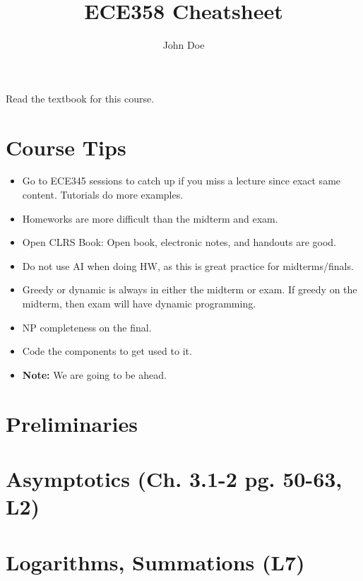 \documentclass{article}
\title{ECE358 Cheatsheet}
\author{John Doe}
\begin{document}
\maketitle

\tableofcontents

\listoffigures

\listoftables

Read the textbook for this course. 

\section{Course Tips}
\begin{intuition}
    \begin{itemize}
        \item Go to ECE345 sessions to catch up if you miss a lecture since exact same content. Tutorials do more examples. 
        \item Homeworks are more difficult than the midterm and exam.
        \item Open CLRS Book: Open book, electronic notes, and handouts are good. 
        \item Do not use AI when doing HW, as this is great practice for midterms/finals.
        \item Greedy or dynamic is always in either the midterm or exam. If greedy on the midterm, then exam will have dynamic programming. 
        \item NP completeness on the final. 
        \item Code the components to get used to it. 
        \item \textbf{Note:} We are going to be ahead. 
    \end{itemize}
\end{intuition}

\section{Preliminaries}

\newpage

\section{Asymptotics (Ch. 3.1-2 pg. 50-63, L2)} 

\newpage

\section{Logarithms, Summations (L7)} %

\newpage
\end{document}
